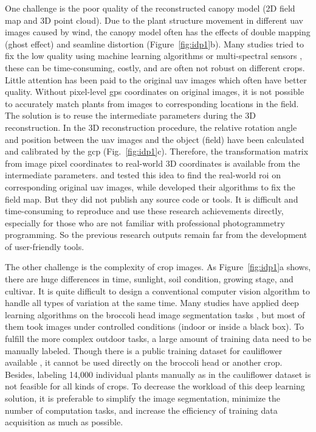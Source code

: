 One challenge is the poor quality of the reconstructed canopy model (2D field map and 3D point cloud). Due to the plant structure movement in different \gls{uav} images caused by wind, the canopy model often has the effects of double mapping (ghost effect) and seamline distortion \citep{lin_new_2021} (Figure~\ref{fig:idp1}b). Many studies tried to fix the low quality using machine learning algorithms \citep{hu_pixel_2019,hu_coupling_2021,velumani_estimates_2021} or multi-spectral sensors \citep{guo_wheat_2021,lu_assessment_2022}, these can be time-consuming, costly, and are often not robust on different crops. Little attention has been paid to the original \gls{uav} images which often have better quality. Without pixel-level \gls{gps} coordinates on original images, it is not possible to accurately match plants from images to corresponding locations in the field. The solution is to reuse the intermediate parameters during the 3D reconstruction. In the 3D reconstruction procedure, the relative rotation angle and position between the \gls{uav} images and the object (field) have been calculated and calibrated by the \gls{gcp} (Fig.~\ref{fig:idp1}c). Therefore, the transformation matrix from image pixel coordinates to real-world 3D coordinates is available from the intermediate parameters. \citet{duan_comparison_2017} and \citet{guo_aerial_2018} tested this idea to find the real-world \gls{roi} on corresponding original \gls{uav} images, while \citet{lin_new_2021} developed their algorithms to fix the field map. But they did not publish any source code or tools. It is difficult and time-consuming to reproduce and use these research achievements directly, especially for those who are not familiar with professional photogrammetry programming. So the previous research outputs remain far from the development of user-friendly tools. %



The other challenge is the complexity of crop images. As Figure~\ref{fig:idp1}a shows, there are huge differences in time, sunlight, soil condition, growing stage, and cultivar. It is quite difficult to design a conventional computer vision algorithm to handle all types of variation at the same time. Many studies have applied deep learning algorithms on the broccoli head image segmentation tasks \citep{garcia_towards_2021,blok_image_2021,zhou_monitoring_2020}, but most of them took images under controlled conditions (indoor or inside a black box). To fulfill the more complex outdoor tasks, a large amount of training data need to be manually labeled. Though there is a public training dataset for cauliflower available \citep{kierdorf_growliflower_2022}, it cannot be used directly on the broccoli head or another crop. Besides, labeling 14,000 individual plants manually as in the cauliflower dataset is not feasible for all kinds of crops. To decrease the workload of this deep learning solution, it is preferable to simplify the image segmentation, minimize the number of computation tasks, and increase the efficiency of training data acquisition as much as possible.

